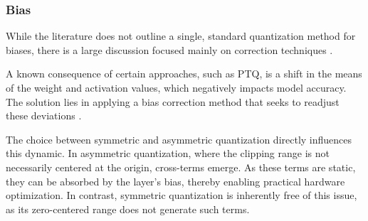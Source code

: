 \subsubsection*{Bias}



While the literature does not outline a single, standard quantization method for biases, there is a large discussion focused mainly on correction techniques \cite{gholami2021surveyquantizationmethodsefficient}. 

A known consequence of certain approaches, such as PTQ, is a shift in the means of the weight and activation values, which negatively impacts model accuracy. The solution lies in applying a bias correction method that seeks to readjust these deviations \cite{gholami2021surveyquantizationmethodsefficient}.

The choice between symmetric and asymmetric quantization directly influences this dynamic. In asymmetric quantization, where the clipping range is not necessarily centered at the origin, cross-terms emerge. As these terms are static, they can be absorbed by the layer's bias, thereby enabling practical hardware optimization. In contrast, symmetric quantization is inherently free of this issue, as its zero-centered range does not generate such terms.

